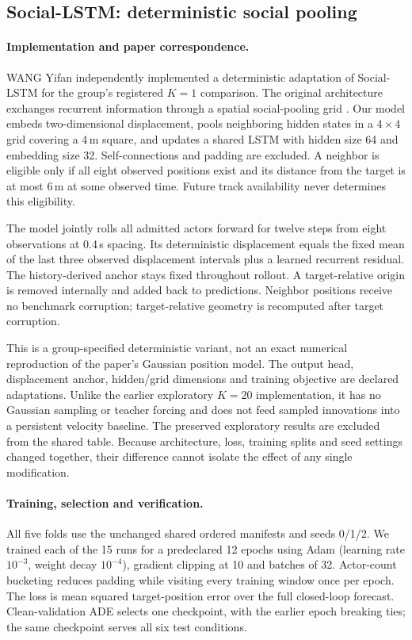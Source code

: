 \subsection{Social-LSTM: deterministic social pooling}
\label{sec:social_lstm}
\paragraph{Implementation and paper correspondence.}
WANG Yifan independently implemented a deterministic adaptation of Social-LSTM for the group's registered $K=1$ comparison. The original architecture exchanges recurrent information through a spatial social-pooling grid \cite{alahi2016social}. Our model embeds two-dimensional displacement, pools neighboring hidden states in a $4\times4$ grid covering a 4\,m square, and updates a shared LSTM with hidden size 64 and embedding size 32. Self-connections and padding are excluded. A neighbor is eligible only if all eight observed positions exist and its distance from the target is at most 6\,m at some observed time. Future track availability never determines this eligibility.

The model jointly rolls all admitted actors forward for twelve steps from eight observations at 0.4\,s spacing. Its deterministic displacement equals the fixed mean of the last three observed displacement intervals plus a learned recurrent residual. The history-derived anchor stays fixed throughout rollout. A target-relative origin is removed internally and added back to predictions. Neighbor positions receive no benchmark corruption; target-relative geometry is recomputed after target corruption.

This is a group-specified deterministic variant, not an exact numerical reproduction of the paper's Gaussian position model. The output head, displacement anchor, hidden/grid dimensions and training objective are declared adaptations. Unlike the earlier exploratory $K=20$ implementation, it has no Gaussian sampling or teacher forcing and does not feed sampled innovations into a persistent velocity baseline. The preserved exploratory results are excluded from the shared table. Because architecture, loss, training splits and seed settings changed together, their difference cannot isolate the effect of any single modification.

\paragraph{Training, selection and verification.}
All five folds use the unchanged shared ordered manifests and seeds 0/1/2. We trained each of the 15 runs for a predeclared 12 epochs using Adam (learning rate $10^{-3}$, weight decay $10^{-4}$), gradient clipping at 10 and batches of 32. Actor-count bucketing reduces padding while visiting every training window once per epoch. The loss is mean squared target-position error over the full closed-loop forecast. Clean-validation ADE selects one checkpoint, with the earlier epoch breaking ties; the same checkpoint serves all six test conditions.

